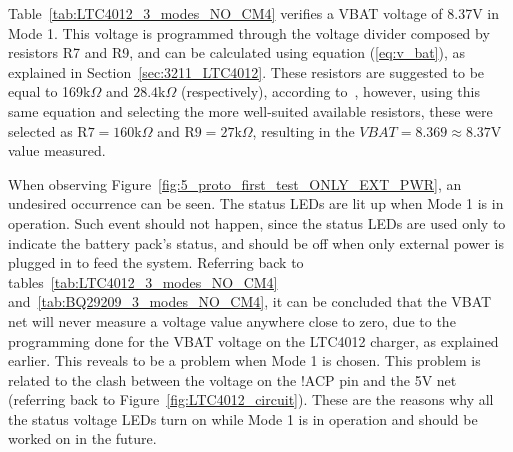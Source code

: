 Table~\ref{tab:LTC4012_3_modes_NO_CM4} verifies a VBAT voltage of 8.37V in Mode 1. This voltage is programmed through the voltage divider composed by resistors R7 and R9, and can be calculated using equation (\ref{eq:v_bat}), as explained in Section~\ref{sec:3211_LTC4012}. These resistors are suggested to be equal to 169k$\Omega$ and $28.4$k$\Omega$ (respectively), according to~\cite{LTC4012}, however, using this same equation and selecting the more well-suited available resistors, these were selected as R$7=160$k$\Omega$ and R$9=27$k$\Omega$, resulting in the $VBAT=8.369 \approx 8.37$V value measured.


\begingroup
\begin{table}[H]
	\caption{BQ29209 circuit's most relevant voltages expected and measured, for all operational modes, with the CM4 unmounted from the prototype.}
	\label{tab:BQ29209_3_modes_NO_CM4}
	\centering
\end{table}
\endgroup%

When observing Figure~\ref{fig:5_proto_first_test_ONLY_EXT_PWR}, an undesired occurrence can be seen. The status LEDs are lit up when Mode 1 is in operation.
Such event should not happen, since the status LEDs are used only to indicate the battery pack's status, and should be off when only external power is plugged in to feed the system.
Referring back to tables~\ref{tab:LTC4012_3_modes_NO_CM4} and~\ref{tab:BQ29209_3_modes_NO_CM4}, it can be concluded that the VBAT net will never measure a voltage value anywhere close to zero, due to the programming done for the VBAT voltage on the LTC4012 charger, as explained earlier. This reveals to be a problem when Mode 1 is chosen. This problem is related to the clash between the voltage on the !ACP pin and the 5V net (referring back to Figure~\ref{fig:LTC4012_circuit}). These are the reasons why all the status voltage LEDs turn on while Mode 1 is in operation and should be worked on in the future. 


